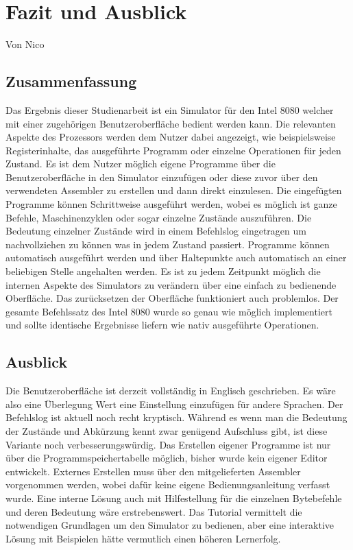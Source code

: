 \documentclass[12pt]{article}
\begin{document}
\newpage

\section{Fazit und Ausblick}
Von Nico \\

\noindent
\subsection{Zusammenfassung}
Das Ergebnis dieser Studienarbeit ist ein Simulator für den Intel 8080 welcher mit einer zugehörigen Benutzeroberfläche bedient werden kann. Die relevanten Aspekte des Prozessors werden dem Nutzer dabei angezeigt, wie beispielsweise Registerinhalte, das ausgeführte Programm oder einzelne Operationen für jeden Zustand. Es ist dem Nutzer möglich eigene Programme über die Benutzeroberfläche in den Simulator einzufügen oder diese zuvor über den verwendeten Assembler zu erstellen und dann direkt einzulesen. Die eingefügten Programme können Schrittweise ausgeführt werden, wobei es möglich ist ganze Befehle, Maschinenzyklen oder sogar einzelne Zustände auszuführen. Die Bedeutung einzelner Zustände wird in einem Befehlslog eingetragen um nachvollziehen zu können was in jedem Zustand passiert. Programme können automatisch ausgeführt werden und über Haltepunkte auch automatisch an einer beliebigen Stelle angehalten werden. Es ist zu jedem Zeitpunkt möglich die internen Aspekte des Simulators zu verändern über eine einfach zu bedienende Oberfläche. Das zurücksetzen der Oberfläche funktioniert auch problemlos. Der gesamte Befehlssatz des Intel 8080 wurde so genau wie möglich implementiert und sollte identische Ergebnisse liefern wie nativ ausgeführte Operationen.

\subsection{Ausblick}
Die Benutzeroberfläche ist derzeit vollständig in Englisch geschrieben. Es wäre also eine Überlegung Wert eine Einstellung einzufügen für andere Sprachen. Der Befehlslog ist aktuell noch recht kryptisch. Während es wenn man die Bedeutung der Zustände und Abkürzung kennt zwar genügend Aufschluss gibt, ist diese Variante noch verbesserungswürdig. Das Erstellen eigener Programme ist nur über die Programmspeichertabelle möglich, bisher wurde kein eigener Editor entwickelt. Externes Erstellen muss über den mitgelieferten Assembler vorgenommen werden, wobei dafür keine eigene Bedienungsanleitung verfasst wurde. Eine interne Lösung auch mit Hilfestellung für die einzelnen Bytebefehle und deren Bedeutung wäre erstrebenswert. Das Tutorial vermittelt die notwendigen Grundlagen um den Simulator zu bedienen, aber eine interaktive Lösung mit Beispielen hätte vermutlich einen höheren Lernerfolg.
\end{document}
